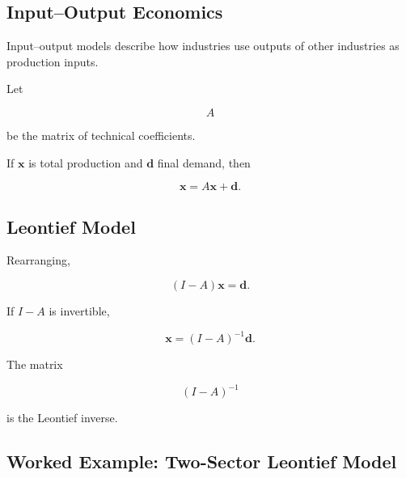 \subsection{Input--Output Economics}
\label{subsec:input-output-economics}

Input--output models describe how industries use outputs of other industries
as production inputs.

Let

\[
\boxed{
A
}
\]

be the matrix of technical coefficients.

If \(\mathbf{x}\) is total production and \(\mathbf{d}\) final demand, then

\[
\boxed{
\mathbf{x}
=
A\mathbf{x}
+
\mathbf{d}.
}
\]

\subsection{Leontief Model}
\label{subsec:leontief-model}

Rearranging,

\[
\boxed{
(I-A)\mathbf{x}
=
\mathbf{d}.
}
\]

If \(I-A\) is invertible,

\[
\boxed{
\mathbf{x}
=
(I-A)^{-1}\mathbf{d}.
}
\]

The matrix

\[
\boxed{
(I-A)^{-1}
}
\]

is the Leontief inverse.

\subsection{Worked Example: Two-Sector Leontief Model}
\label{subsec:worked-leontief}


